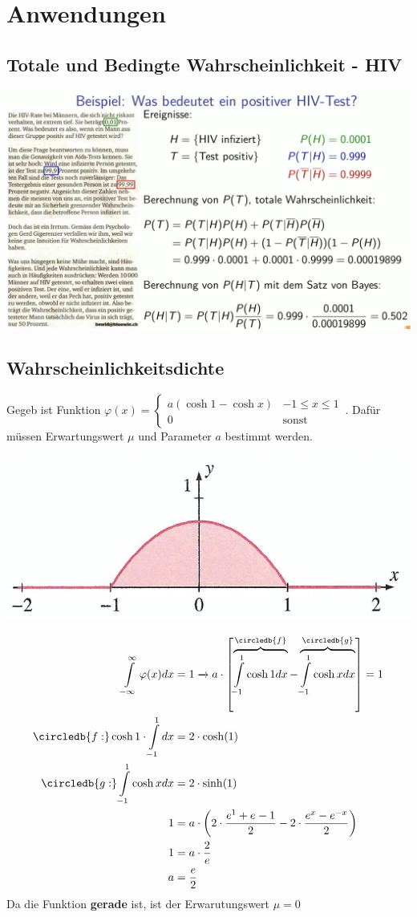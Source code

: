 \section{Anwendungen}
\subsection{Totale und Bedingte Wahrscheinlichkeit - HIV}
\includegraphics[width=\linewidth]{Images/HIV}

\subsection{Wahrscheinlichkeitsdichte}\label{wdichte}
Gegeb ist Funktion $\varphi(x) = \begin{cases}	a(\cosh 1 - \cosh x) & -1 \le x \le 1\, \\ 0 & \text{sonst}\end{cases}$. Dafür müssen Erwartungswert $\mu$ und Parameter $a$ bestimmt werden.
\begin{center}
	\includegraphics[width=0.6\columnwidth]{Images/wdichte}
\end{center}
\begin{align*}
	\int\limits_{-\infty}^{\infty}\varphi(x)dx &= 1 \xrightarrow{} a\cdot\left[\overbrace{\int\limits_{-1}^{1}\cosh 1dx}^{\circledb{f}} - \overbrace{\int\limits_{-1}^{1}\cosh xdx}^{\circledb{g}}\right] = 1\\
	\circledb{f:} \cosh 1\cdot\int\limits_{-1}^{1}dx &= 2\cdot\cosh(1)\\
	\circledb{g:} \int\limits_{-1}^{1}\cosh xdx &= 2\cdot\sinh(1)\\
	1 &= a\cdot \left(2\cdot \frac{e^1+e^{}-1}{2} - 2\cdot\frac{e^x-e^{-x}}{2}\right) \\
	1 &= a \cdot\frac{2}{e} \\
	a &= \frac{e}{2}
\end{align*}
Da die Funktion \textbf{gerade} ist, ist der Erwarutungswert $\mu = 0$
